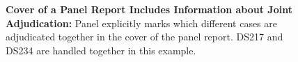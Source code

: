 \begin{figure}[h]
  \centering
  \caption{\textbf{Cover of a Panel Report Includes Information about Joint Adjudication:}
      Panel explicitly marks which different cases are adjudicated together in the cover of the panel report. DS217 and DS234 are handled together in this example.
      }
  \label{fig:linked-cases}
\end{figure}
 
 
 

